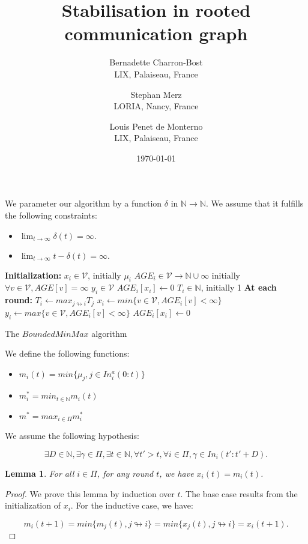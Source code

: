 \documentclass[11pt,letterpaper]{article}
\title{Stabilisation in rooted communication graph}
\author{
	Bernadette Charron-Bost \\
	LIX, Palaiseau, France
\and
	Stephan Merz \\
	LORIA, Nancy, France
\and
	Louis Penet de Monterno \\
	LIX, Palaiseau, France
}
\date{\today}
\newtheorem{lem}[thm]{Lemma}
\begin{document}
  \maketitle

We parameter our algorithm by a function $\delta$ in $\mathds{N} \rightarrow \mathds{N}$.
We assume that it fulfills the following constraints:
\begin{itemize}
	\item $\lim_{t \rightarrow \infty} \delta(t) = \infty.$
	\item $\lim_{t \rightarrow \infty} t-\delta(t) = \infty.$
\end{itemize}

\begin{algorithm}[htb]
	\DontPrintSemicolon
	\textbf{Initialization:} \;
	\Indp
		$x_i \in \mathcal{V}$, initially $\mu_i$ \;
		$AGE_i \in \mathcal{V} \rightarrow \mathds{N} \cup \infty$ initially $\forall v \in \mathcal{V}, AGE[v] = \infty$ \;
		$y_i \in \mathcal{V}$ \;
		$AGE_i[x_i] \leftarrow 0$ \;
		$T_i \in \mathds{N}$, initially 1 \;
	\BlankLine
	\Indm
	\textbf{At each round:} \;
	\Indp
		$T_i \leftarrow max_{j \looparrowright i} T_j$ \label{line:maxT} \;
		$x_i \leftarrow min \{v \in \mathcal{V}, AGE_i[v] < \infty\}$ \;
		$y_i \leftarrow max \{v \in \mathcal{V}, AGE_i[v] < \infty\}$ \;
		$AGE_i[x_i] \leftarrow 0$ \;
	\Indm
\caption{The $BoundedMinMax$ algorithm} 
\end{algorithm}

We define the following functions:
\begin{itemize}
	\item $m_i(t) = min \{\mu_j, j \in In_i^a(0:t)\}$
	\item $m_i^* = min_{t \in \mathds{N}} m_i(t)$
	\item $m^* = max_{i \in \Pi} m_i^*$
\end{itemize}

We assume the following hypothesis:

$$\exists D \in \mathds{N}, \exists \gamma \in \Pi, \exists t \in \mathds{N}, \forall t' > t, \forall i \in \Pi, \gamma \in In_i(t':t'+D).$$

\begin{lem} \label{lem:stabX}
	For all $i \in \Pi$, for any round $t$, we have $x_i(t) = m_i(t)$.
\end{lem}
\begin{proof}
	We prove this lemma by induction over $t$.
	The base case results from the initialization of $x_i$.
	For the inductive case, we have:

	$$m_i(t+1) = min \{m_j(t), j \looparrowright i\} = min \{x_j(t), j \looparrowright i\} = x_i(t+1).$$
\end{proof}
\end{document}
